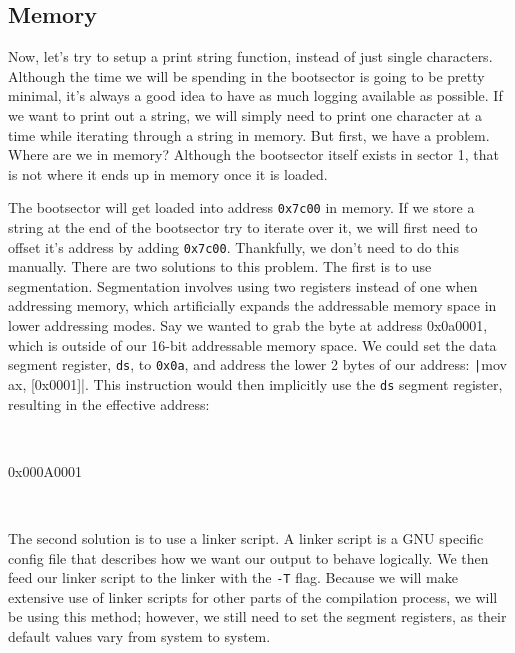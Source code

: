 \documentclass{article}
\begin{document}
\subsection{Memory}

Now, let's try to setup a print string function, instead of just single characters. Although the time we will
be spending in the bootsector is going to be pretty minimal, it's always a good idea to have as much logging
available as possible. If we want to print out a string, we will simply need to print one character at a time
while iterating through a string in memory. But first, we have a problem. Where are we in memory? Although
the bootsector itself exists in sector 1, that is not where it ends up in memory once it is loaded.

The bootsector will get loaded into address \Verb|0x7c00| in memory. If we store a string at the end of the
bootsector try to iterate over it, we will first need to offset it's address by adding \Verb|0x7c00|.
Thankfully, we don't need to do this manually. There are two solutions to this problem. The first is to use
segmentation. Segmentation involves using two registers instead of one when addressing memory, which
artificially expands the addressable memory space in lower addressing modes. Say we wanted to grab the byte
at address 0x0a0001, which is outside of our 16-bit addressable memory space. We could set the data segment
register, \Verb|ds|, to \Verb|0x0a|, and address the lower 2 bytes of our address:
\texttt|mov ax, [0x0001]|. This instruction would then implicitly use the \Verb|ds| segment register,
resulting in the effective address:

\begin{center}
	\begin{bytefield}[bitwidth=0.02\linewidth]{32}
		 \\
		\begin{rightwordgroup}{0x000A0001}
		\end{rightwordgroup} \\
	\end{bytefield}
\end{center}

The second solution is to use a linker script. A linker script is a GNU specific config file that describes how
we want our output to behave logically. We then feed our linker script to the linker with the \Verb|-T| flag.
Because we will make extensive use of linker scripts for other parts of the compilation process, we will be using
this method; however, we still need to set the segment registers, as their default values vary from system to system.
\end{document}
